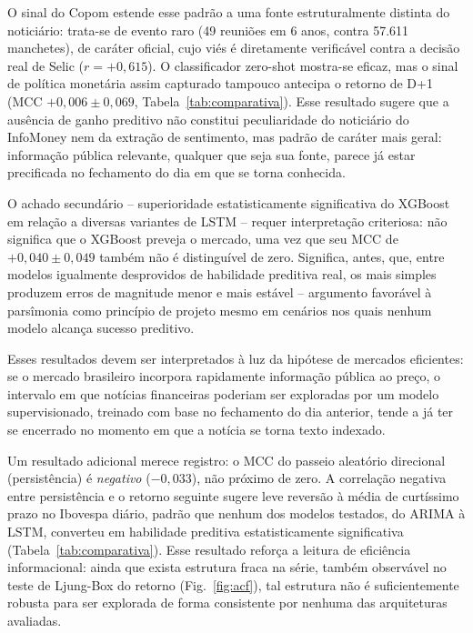 \documentclass[conference]{IEEEtran}
\begin{document}
O sinal do Copom estende esse padr\~ao a uma fonte estruturalmente distinta do noticiário: trata-se de evento raro (49 reuni\~oes em 6 anos, contra 57.611 manchetes), de car\'ater oficial, cujo vi\'es \'e diretamente verific\'avel contra a decis\~ao real de Selic ($r=+0{,}615$). O classificador zero-shot mostra-se eficaz, mas o sinal de pol\'itica monet\'aria assim capturado tampouco antecipa o retorno de D+1 (MCC $+0{,}006\pm0{,}069$, Tabela~\ref{tab:comparativa}). Esse resultado sugere que a aus\^encia de ganho preditivo n\~ao constitui peculiaridade do noticiário do InfoMoney nem da extra\c{c}\~ao de sentimento, mas padr\~ao de car\'ater mais geral: informa\c{c}\~ao p\'ublica relevante, qualquer que seja sua fonte, parece j\'a estar precificada no fechamento do dia em que se torna conhecida.

O achado secund\'ario -- superioridade estatisticamente significativa do XGBoost em rela\c{c}\~ao a diversas variantes de LSTM -- requer interpreta\c{c}\~ao criteriosa: n\~ao significa que o XGBoost preveja o mercado, uma vez que seu MCC de $+0{,}040\pm0{,}049$ tamb\'em n\~ao \'e distingu\'ivel de zero. Significa, antes, que, entre modelos igualmente desprovidos de habilidade preditiva real, os mais simples produzem erros de magnitude menor e mais est\'avel -- argumento favor\'avel \`a pars\^imonia como princ\'ipio de projeto mesmo em cen\'arios nos quais nenhum modelo alcan\c{c}a sucesso preditivo.

Esses resultados devem ser interpretados \`a luz da hip\'otese de mercados eficientes: se o mercado brasileiro incorpora rapidamente informa\c{c}\~ao p\'ublica ao pre\c{c}o, o intervalo em que not\'icias financeiras poderiam ser exploradas por um modelo supervisionado, treinado com base no fechamento do dia anterior, tende a j\'a ter se encerrado no momento em que a not\'icia se torna texto indexado.

Um resultado adicional merece registro: o MCC do passeio aleat\'orio direcional (persist\^encia) \'e \emph{negativo} ($-0{,}033$), n\~ao pr\'oximo de zero. A correla\c{c}\~ao negativa entre persist\^encia e o retorno seguinte sugere leve revers\~ao \`a m\'edia de curt\'issimo prazo no Ibovespa di\'ario, padr\~ao que nenhum dos modelos testados, do ARIMA \`a LSTM, converteu em habilidade preditiva estatisticamente significativa (Tabela~\ref{tab:comparativa}). Esse resultado refor\c{c}a a leitura de efici\^encia informacional: ainda que exista estrutura fraca na s\'erie, tamb\'em observ\'avel no teste de Ljung-Box do retorno (Fig.~\ref{fig:acf}), tal estrutura n\~ao \'e suficientemente robusta para ser explorada de forma consistente por nenhuma das arquiteturas avaliadas.
\end{document}
